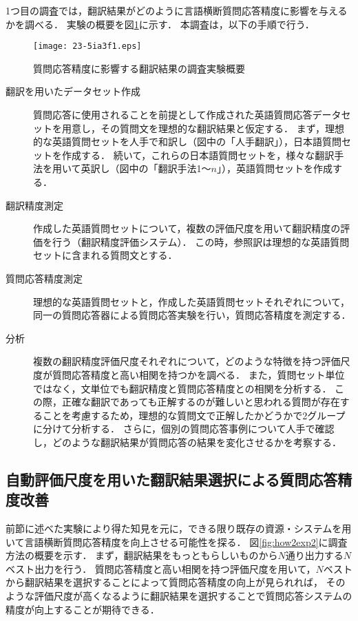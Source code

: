 \documentclass[japanese]{jnlp_1.4}
\begin{document}
1つ目の調査では，翻訳結果がどのように言語横断質問応答精度に影響を与えるかを調べる．
実験の概要を図\ref{fig:how2exp1}に示す．
本調査は，以下の手順で行う．

\begin{figure}[b]
\begin{center}
\texttt{[image: 23-5ia3f1.eps]}
\end{center}
\caption{質問応答精度に影響する翻訳結果の調査実験概要}
\label{fig:how2exp1}
\end{figure}

\begin{description}
\item[翻訳を用いたデータセット作成]
質問応答に使用されることを前提として作成された英語質問応答データセットを用意し，その質問文を理想的な翻訳結果と仮定する．
まず，理想的な英語質問セットを人手で和訳し（図中の「人手翻訳」），日本語質問セットを作成する．
続いて，これらの日本語質問セットを，様々な翻訳手法を用いて英訳し（図中の「翻訳手法1〜$n$」），英語質問セットを作成する．

\item[翻訳精度測定]
作成した英語質問セットについて，複数の評価尺度を用いて翻訳精度の評価を行う（翻訳精度評価システム）．
この時，参照訳は理想的な英語質問セットに含まれる質問文とする．

\item[質問応答精度測定]
理想的な英語質問セットと，作成した英語質問セットそれぞれについて，同一の質問応答器による質問応答実験を行い，質問応答精度を測定する．

\item[分析]
複数の翻訳精度評価尺度それぞれについて，どのような特徴を持つ評価尺度が質問応答精度と高い相関を持つかを調べる．
また，質問セット単位ではなく，文単位でも翻訳精度と質問応答精度との相関を分析する．
この際，正確な翻訳であっても正解するのが難しいと思われる質問が存在することを考慮するため，理想的な質問文で正解したかどうかで2グループに分けて分析する．
さらに，個別の質問応答事例について人手で確認し，どのような翻訳結果が質問応答の結果を変化させるかを考察する．
\end{description}	


\subsection{自動評価尺度を用いた翻訳結果選択による質問応答精度改善}
\label{sec:how2exp2}

前節に述べた実験により得た知見を元に，できる限り既存の資源・システムを用いて言語横断質問応答精度を向上させる可能性を探る．
図\ref{fig:how2exp2}に調査方法の概要を示す．
まず，翻訳結果をもっともらしいものから$N$通り出力する$N$ベスト出力を行う．
質問応答精度と高い相関を持つ評価尺度を用いて，$N$ベストから翻訳結果を選択することによって質問応答精度の向上が見られれば，
そのような評価尺度が高くなるように翻訳結果を選択することで質問応答システムの精度が向上することが期待できる．
\end{document}

